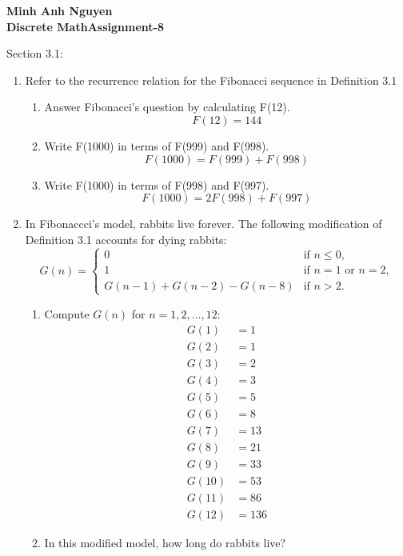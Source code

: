 \documentclass[12pt]{article}
\begin{document}
\textbf{Minh Anh Nguyen }\\
\textbf{Discrete Math\hfill Assignment-8}

\hrulefill

Section 3.1:

\begin{enumerate}
    \item Refer to the recurrence relation for the Fibonacci sequence in Definition 3.1
    \begin{enumerate}
        \item Answer Fibonacci's question by calculating F(12).
            \[F(12) = 144\]
        \item Write F(1000) in terms of F(999) and F(998).
            \[F(1000) = F(999) + F(998)\]
        \item Write F(1000) in terms of F(998) and F(997).
            \[F(1000) = 2F(998) + F(997)\]
    \end{enumerate}
    \item In Fibonaccci's model, rabbits live forever. The following modification of Definition 3.1 accounts for dying rabbits:
    \[
    G(n) = 
    \begin{cases} 
    0 & \text{if } n \leq 0, \\
    1 & \text{if } n = 1 \text{ or } n = 2, \\
    G(n - 1) + G(n - 2) - G(n - 8) & \text{if } n > 2.
    \end{cases}
    \]
    \begin{enumerate}
    \item Compute \( G(n) \) for \( n = 1, 2, \ldots, 12 \):
    \begin{align*}
        G(1) &= 1 \\
        G(2) &= 1 \\
        G(3) &= 2 \\
        G(4) &= 3 \\
        G(5) &= 5 \\
        G(6) &= 8 \\
        G(7) &= 13 \\
        G(8) &= 21 \\
        G(9) &= 33 \\
        G(10) &= 53 \\
        G(11) &= 86 \\
        G(12) &= 136
    \end{align*}
        \item In this modified model, how long do rabbits live?\\

\end{enumerate}
\end{enumerate}
\end{document}
